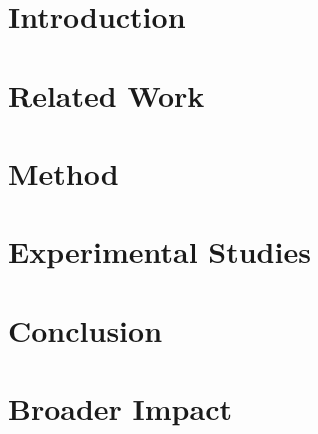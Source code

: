 \documentclass{article}
\numberwithin{equation}{section}
\begin{document}
\title{}


\maketitle

\begin{abstract}
  
\end{abstract}

\section{Introduction}
\label{sec:intro}


\section{Related Work}
\label{sec:related}


\section{Method}
\label{sec:method}


\section{Experimental Studies}
\label{sec:exp}


\section{Conclusion}
\label{sec:conclusion}


\begin{ack}
  
\end{ack}




\newpage
\section*{Broader Impact}


\newpage


\appendix

\end{document}
